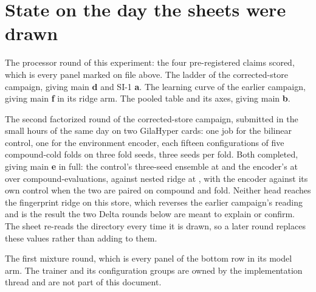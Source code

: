 
\clearpage
\section{State on the day the sheets were drawn}
\label{sec:state}

 The processor round of this experiment: the four
pre-registered claims scored, which is every panel marked on file above. The ladder of
the corrected-store campaign, giving main \textbf{d} and SI-1 \textbf{a}. The learning
curve of the earlier campaign, giving main \textbf{f} in its ridge arm. The pooled table
and its axes, giving main \textbf{b}.

 The second factorized round of the
corrected-store campaign, submitted in the small hours of the same day on two GilaHyper
cards: one job for the bilinear control, one for the environment encoder, each fifteen
configurations of five compound-cold folds on three fold seeds, three seeds per fold. Both
completed, giving main \textbf{e} in full: the control's three-seed ensemble at
\hydbilinearMedian{} and the encoder's at \hydenvencMedian{} over
\hydbilinearEvaluations{} compound-evaluations, against nested ridge at
\hydladderRidge{}, with the encoder \hydpairedMedian{} against its own control when the
two are paired on compound and fold. Neither head reaches the fingerprint ridge on this
store, which reverses the earlier campaign's reading and is the result the two Delta
rounds below are meant to explain or confirm. The sheet re-reads the directory every time
it is drawn, so a later round replaces these values rather than adding to them.

 The first mixture round, which is every panel of the bottom
row in its model arm. The trainer and its configuration groups are owned by the
implementation thread and are not part of this document.

